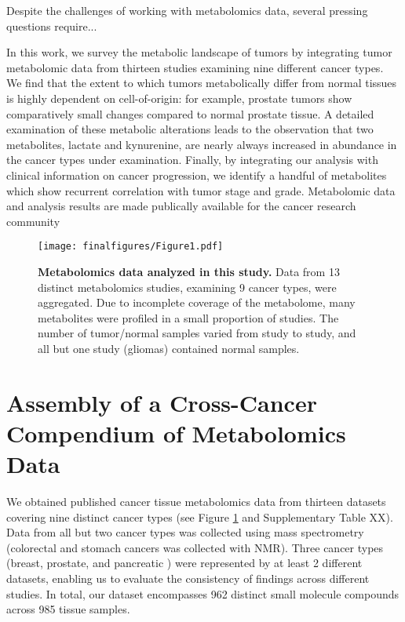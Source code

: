 \documentclass[10pt]{article}
\begin{document}
Despite the challenges of working with metabolomics data, several pressing questions require...

In this work, we survey the metabolic landscape of tumors by integrating tumor metabolomic data from thirteen studies examining nine different cancer types. We find that the extent to which tumors metabolically differ from normal tissues is highly dependent on cell-of-origin: for example, prostate tumors show comparatively small changes compared to normal prostate tissue. A detailed examination of these metabolic alterations leads to the observation that two metabolites, lactate and kynurenine, are nearly always increased in abundance in the cancer types under examination. Finally, by integrating our analysis with clinical information on cancer progression, we identify a handful of metabolites which show recurrent correlation with tumor stage and grade. Metabolomic data and analysis results are made publically available for the cancer research community


\begin{figure}[ht!]
  \centering
     \texttt{[image: finalfigures/Figure1.pdf]}
  \caption{\textbf{Metabolomics data analyzed in this study.} Data from 13 distinct metabolomics studies, examining 9 cancer types, were aggregated. Due to incomplete coverage of the metabolome, many metabolites were profiled in a small proportion of studies. The number of tumor/normal samples varied from study to study, and all but one study (gliomas) contained normal samples.}
     \label{fig:Fig1}
\end{figure}

\section{Assembly of a Cross-Cancer Compendium of Metabolomics Data}
We obtained published cancer tissue metabolomics data from thirteen datasets covering nine distinct cancer types (see Figure \ref{fig:Fig1} and Supplementary Table XX). Data from all but two cancer types was collected using mass spectrometry (colorectal and stomach cancers was collected with NMR). Three cancer types (breast, prostate, and pancreatic \cite{Hirayama2009}) were represented by at least 2 different datasets, enabling us to evaluate the consistency of findings across different studies. In total, our dataset encompasses 962 distinct small molecule compounds across 985 tissue samples. 
\end{document}
